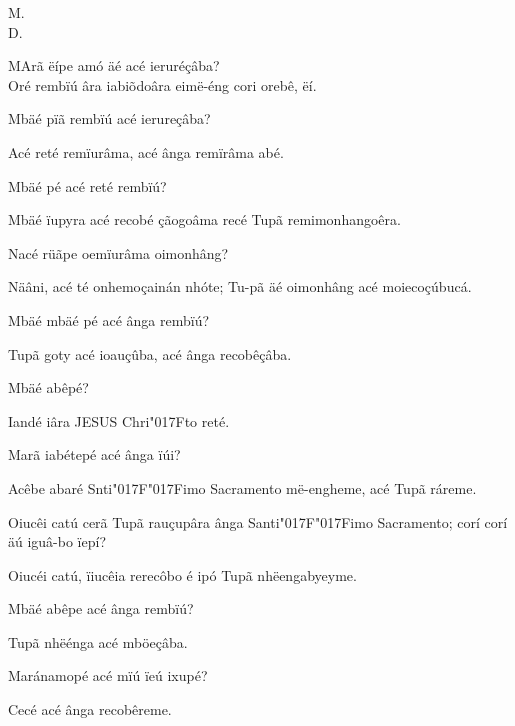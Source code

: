 \documentclass[openany,titlepage,12pt]{book}
\newcommand{\lgS}{\char"017F}
\newcommand{\lgSS}{\char"017F\char"017F}
\newcommand{\comecalista}[5]{
    \hspace*{-11.7pt}
    \begin{minipage}[t]{0.08\linewidth}
        \flushright #1\\#2
    \end{minipage}
    \hspace{0pt}
    \begin{minipage}[t]{0.94\linewidth}
        \lettrine
        [findent =2pt, nindent=0pt,  lines=2]
        {#3}{#4}#5
    \end{minipage}
    \vspace*{-3pt}
}
\begin{document}
\comecalista{M.}{D.}{M}{A}
    {rã ëípe amó äé acé ieruréçâba?\\
    Oré rembïú âra iabiõdoâra eimë-éng cori orebê, ëí.}
\begin{alternate}
    \item Mbäé pïã rembïú acé ierureçâba?
    \item Acé reté remïurâma, acé ânga remïrâma abé.
    \item Mbäé pé acé reté rembïú?
    \item Mbäé ïupyra acé recobé çãogoâma recé Tupã
    remimonhangoêra.
    \item Nacé rüãpe oemïurâma oimonhâng?
    \item Näâni, acé té onhemoçainán nhóte; Tu-pã äé oimonhâng
    acé moiecoçúbucá.
    \item Mbäé mbäé pé acé ânga rembïú?
    \item Tupã goty acé ioauçûba, acé ânga recobêçâba.
    \item Mbäé abêpé?
    \item Iandé iâra JESUS Chri\lgS to reté.
    \item Marã iabétepé acé ânga ïúi?
    \item Acêbe abaré Snti\lgSS imo Sacramento më-engheme,
    acé Tupã ráreme.
    \item Oiucêi catú cerã Tupã rauçupâra ânga Santi\lgSS imo
    Sacramento; corí corí äú iguâ-bo ïepí?
    \item Oiucéi catú, ïiucêia rerecôbo é ipó Tupã nhëengabyeyme.
    \item Mbäé abêpe acé ânga rembïú?
    \item Tupã nhëénga acé mböeçâba.
    \item Maránamopé acé mïú ïeú ixupé?
    \item Cecé acé ânga recobêreme.
\end{alternate}
\unskip\vspace*{-0.7\baselineskip}
\end{document}

